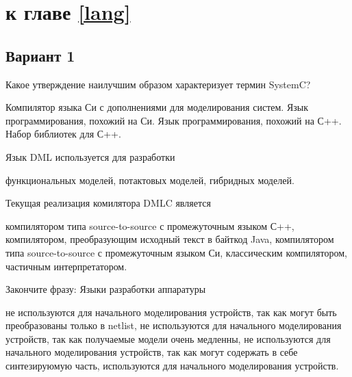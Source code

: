 
\section{\Questions к главе \ref{lang}} %

\subsection*{Вариант 1}

\begin{questions}

\question[3] Какое утверждение наилучшим образом характеризует термин SystemC?
\begin{choices}
    \choice Компилятор языка Си с дополнениями для моделирования систем.
    \choice Язык программирования, похожий на Си.
    \choice Язык программирования, похожий на С++.
    \correctchoice Набор библиотек для С++.
\end{choices}

\question[3] Язык DML используется для разработки
\begin{choices}
    \correctchoice функциональных моделей,
    \choice потактовых моделей,
    \choice гибридных моделей.
\end{choices}

\question[3] Текущая реализация комилятора DMLC является
\begin{choices}
    \choice компилятором типа source-to-source с промежуточным языком С++,
    \choice компилятором, преобразующим исходный текст в байткод Java,
    \correctchoice компилятором типа source-to-source с промежуточным языком Си,
    \choice классическим компилятором,
    \choice частичным интерпретатором.
\end{choices}

\question[3] Закончите фразу: Языки разработки аппаратуры
\begin{choices}
\choice не используются для начального моделирования устройств, так как могут быть преобразованы только в netlist,
\correctchoice не используются для начального моделирования устройств, так как получаемые модели очень медленны,
\choice не используются для начального моделирования устройств, так как могут содержать в себе синтезируюмую часть,
\choice используются для начального моделирования устройств.
\end{choices}


\end{questions}

